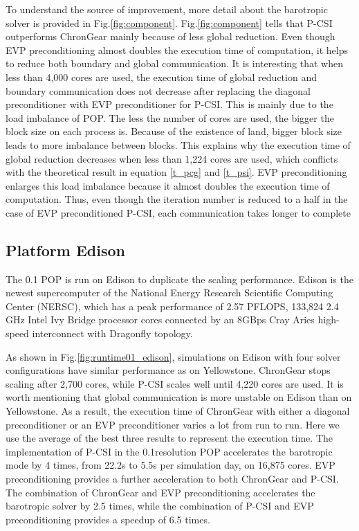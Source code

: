 To understand the source of improvement, more detail about the barotropic solver is provided in Fig.\ref{fig:component}.
Fig.\ref{fig:component} tells that P-CSI outperforms ChronGear mainly because of less global reduction. 
Even though EVP preconditioning almost doubles the execution time of computation, it helps to reduce both boundary and global communication. 
It is interesting that when less than 4,000 cores are used, the execution time of global reduction and boundary communication does not decrease after replacing the diagonal preconditioner with EVP preconditioner for P-CSI. 
This is mainly due to the load imbalance of POP. 
The less the number of cores are used, the bigger the block size on each process is. 
Because of the existence of land, bigger block size leads to more imbalance between blocks.   
This explains why the execution time of global reduction decreases when less than 1,224 cores are used, which conflicts with the theoretical result in equation \ref{t_pcg} and \ref{t_psi}. 
EVP preconditioning enlarges this load imbalance because it almost doubles the execution time of computation.
Thus, even though the iteration number is reduced to a half in the case of EVP preconditioned P-CSI, each communication takes longer to complete 

\subsection{Platform Edison}
The 0.1 \degree POP is run on Edison to duplicate the scaling performance. 
Edison is the newest supercomputer of the National Energy Research Scientific Computing Center (NERSC), 
which has a peak performance of 2.57 PFLOPS, 133,824 2.4 GHz Intel Ivy Bridge processor cores connected by an 8GBps Cray Aries high-speed interconnect with Dragonfly topology. 

As shown in Fig.\ref{fig:runtime01_edison}, simulations on Edison with four solver configurations have similar performance as on Yellowstone. ChronGear stops scaling after 2,700 cores, while P-CSI scales well until 4,220 cores are used. 
It is worth mentioning that global communication is more unstable on Edison than on Yellowstone. As a result, the execution time of ChronGear with either a diagonal preconditioner or an EVP preconditioner varies a lot from run to run. Here we use the average of the best three results to represent the execution time. 
The implementation of P-CSI in the 0.1\degree resolution POP accelerates the barotropic mode by 4 times, from 22.2s to 5.5s per simulation day, on 16,875 cores.
EVP preconditioning provides a further acceleration to both ChronGear and P-CSI. 
The combination of ChronGear and EVP preconditioning accelerates the barotropic solver by 2.5 times, 
while the combination of P-CSI and EVP preconditioning provides a speedup of 6.5 times. 
 
